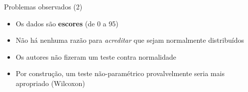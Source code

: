 \documentclass{beamer}
\begin{document}


\begin{frame}{Problemas observados (2)}
  \begin{itemize}
  \item Os dados são {\bf escores} (de 0 a 95)
  \item Não há nenhuma razão para {\em acreditar} que sejam normalmente distribuídos
  \item Os autores não fizeram um teste contra normalidade
  \item Por construção, um teste não-paramétrico provalvelmente seria mais apropriado (Wilcoxon)
  \end{itemize}
\end{frame}
\end{document}
